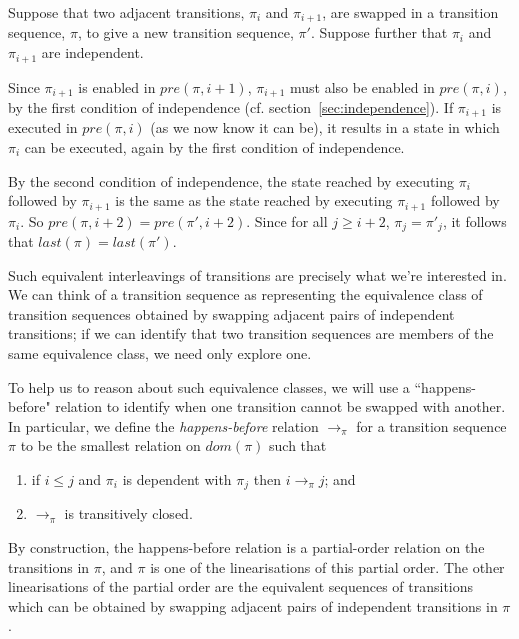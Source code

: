 \documentclass[12pt,a4paper,twoside,openright]{report}
\begin{document}
Suppose that two adjacent transitions, $\pi_i$ and $\pi_{i+1}$,
are swapped in a
transition sequence, $\pi$, to give a new
transition sequence, $\pi'$. Suppose further
that $\pi_i$ and $\pi_{i+1}$ are independent.

Since $\pi_{i+1}$ is enabled in $\textit{pre}(\pi, i+1)$,
$\pi_{i+1}$ must also be enabled in $\textit{pre}(\pi, i)$,
by the first condition of independence
(cf. section~\ref{sec:independence}). If $\pi_{i+1}$
is executed in $\textit{pre}(\pi, i)$ (as we now know
it can be), it results in a state in which $\pi_i$
can be executed, again by the first condition of
independence.

By the second
condition of independence, the state reached by
executing $\pi_i$ followed by $\pi_{i+1}$ is the same
as the state reached by executing $\pi_{i+1}$ followed
by $\pi_i$.
So $\textit{pre}(\pi, i+2) = \textit{pre}(\pi', i+2)$. Since 
for all $j \geq i + 2$, $\pi_j = \pi'_j$, it follows that
$\textit{last}(\pi) = \textit{last}(\pi')$.

Such equivalent interleavings
of transitions are precisely what we're interested in.
We can think of a transition sequence as representing
the equivalence class of transition sequences obtained
by swapping adjacent pairs of independent transitions;
if we can identify that two transition sequences are
members of the same equivalence class, we need only
explore one.

To help us to reason about such equivalence classes,
we will use a ``happens-before" relation to identify
when one transition cannot be swapped with another.
In particular, we define the \emph{happens-before}
relation $\longrightarrow_\pi$ for a transition
sequence $\pi$ to be the smallest relation on
$\textit{dom}(\pi)$ such that
\begin{enumerate}
	\item if $i \leq j$ and $\pi_i$ is dependent with
		$\pi_j$ then $i \longrightarrow_\pi j$; and
	\item $\longrightarrow_\pi$ is transitively closed.
\end{enumerate}

By construction, the happens-before relation is a
partial-order relation on the transitions in $\pi$,
and $\pi$ is one of the linearisations of this
partial order. The other linearisations of the
partial order are the equivalent sequences of
transitions which can be obtained by swapping
adjacent pairs of independent transitions in $\pi$.
\end{document}
